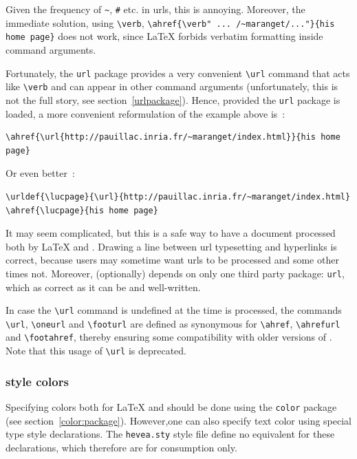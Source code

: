 Given the frequency of \verb+~+, \verb+#+ etc. in urls,
this is annoying. Moreover, the immediate solution, using \verb+\verb+,
\verb+\ahref{\verb" ... /~maranget/..."}{his home page}+ does not
work, since \LaTeX{} forbids verbatim formatting inside command arguments.

Fortunately, the \texttt{url} package provides a very convenient
\verb+\url+ command that acts like \verb+\verb+ and can appear in
other command arguments
(unfortunately, this is not the full story, see section~\ref{urlpackage}).
Hence, provided the \texttt{url} package is loaded,
a more convenient reformulation of the example above is~:
\begin{verbatim}
\ahref{\url{http://pauillac.inria.fr/~maranget/index.html}}{his home page}
\end{verbatim}
Or even better~:
\begin{verbatim}
\urldef{\lucpage}{\url}{http://pauillac.inria.fr/~maranget/index.html}
\ahref{\lucpage}{his home page}
\end{verbatim}
It may seem complicated, but this is a safe way to have a
document processed both by \LaTeX{} and \hevea{}.
Drawing a line between url typesetting and hyperlinks is correct,
because users may sometime want urls to be processed and some other
times not.
Moreover, \hevea{} (optionally) depends on only one third party package:
\texttt{url}, which as correct as it can be and well-written.



In case the \verb+\url+ command is undefined
at the time \verb++ is processed, the commands
\verb+\url+, \verb+\oneurl+ and \verb+\footurl+ are defined as
synonymous for
\verb+\ahref+, \verb+\ahrefurl+ and \verb+\footahref+, thereby
ensuring
some compatibility with older versions of \hevea.
Note that this usage of \verb+\url+ is deprecated.

\subsubsection{\html{} style colors}\label{color:high}
Specifying colors both for \LaTeX{} and
\hevea{} should be done using the \texttt{color} package (see
section~\ref{color:package}).
However,one can also specify text color using special type style declarations.
The \texttt{hevea.sty} style file
define no equivalent for these declarations, which therefore are for
\hevea{} consumption only.

